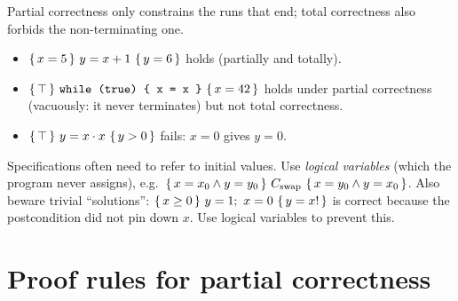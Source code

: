 \begin{center}

\small Partial correctness only constrains the runs that end; total correctness also forbids the
non-terminating one.
\end{center}

\begin{example}
\begin{itemize}
  \item $\{\,x=5\,\}\ y = x+1\ \{\,y=6\,\}$ holds (partially and totally).
  \item $\{\,\top\,\}\ \texttt{while (true) \{ x = x \}}\ \{\,x = 42\,\}$ holds under partial
        correctness (vacuously: it never terminates) but not total correctness.
  \item $\{\,\top\,\}\ y = x\cdot x\ \{\,y > 0\,\}$ fails: $x=0$ gives $y=0$.
\end{itemize}
\end{example}

\begin{important}
Specifications often need to refer to initial values. Use \emph{logical variables}
(which the program never assigns), e.g.\
$\{\,x=x_0\land y=y_0\,\}\ C_{\mathrm{swap}}\ \{\,x=y_0\land y=x_0\,\}$.
Also beware trivial ``solutions'': $\hoare{x\ge0}{y=1;\ x=0}{y=x!}$ is correct because the
postcondition did not pin down $x$. Use logical variables to prevent this.
\end{important}

\section{Proof rules for partial correctness}

